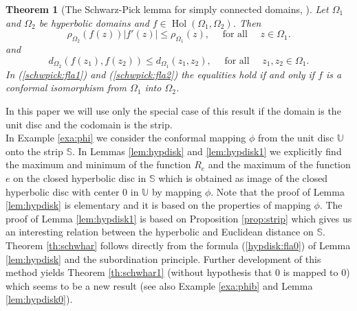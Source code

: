\documentclass{amsart}
\newcommand{\Hol}{\mathop{\mathrm{Hol}}}
\newtheorem{theorem}{Theorem}
\begin{document}
\begin{theorem}[The Schwarz-Pick lemma for simply connected domains, {\cite[Theorem 6.4.]{BeardonMinda}}]\label{th:schwpick}
Let $\Omega_1$ and $\Omega_2$ be hyperbolic domains and $f\in\Hol(\Omega_1,\Omega_2)$. Then
\begin{equation}\label{schwpick:fla1}
    \rho_{\Omega_2}(f(z))|f'(z)|\leqslant\rho_{\Omega_1}(z), \quad \mbox{ for all } \quad z\in\Omega_1.
\end{equation}
and
\begin{equation}\label{schwpick:fla2}
    d_{\Omega_2}(f(z_1),f(z_2))\leqslant d_{\Omega_1}(z_1,z_2), \quad \mbox{ for all } \quad z_1,z_2\in\Omega_1.
\end{equation}
In (\ref{schwpick:fla1}) and (\ref{schwpick:fla2}) the equalities hold if and only if $f$ is a conformal isomorphism from $\Omega_1$ into $\Omega_2$.
\end{theorem}
In this paper we will use only the special case of this result if the domain is the unit disc  and  the  codomain is the strip.\\





In  Example \ref{exa:phi} we consider the conformal mapping $\phi$ from the unit disc $\mathbb{U}$ onto the strip $\mathbb{S}$. In  Lemmas \ref{lem:hypdisk}  and \ref{lem:hypdisk1}  we explicitly find  the maximum and minimum of the function  $R_e$ and the maximum of the function $e$ on the closed hyperbolic disc in $\mathbb{S}$ which is obtained as image of the closed hyperbolic disc with center $0$ in $\mathbb{U}$ by mapping $\phi$. Note that the proof of Lemma \ref{lem:hypdisk} is elementary  and it is based on the properties of mapping $\phi$. The proof of Lemma \ref{lem:hypdisk1} is based on Proposition \ref{prop:strip} which gives us an interesting relation between the hyperbolic and Euclidean distance on $\mathbb{S}$. Theorem \ref{th:schwhar} follows directly  from the formula (\ref{hypdisk:fla0}) of Lemma \ref{lem:hypdisk}  and the subordination principle. Further development  of this  method  yields  Theorem \ref{th:schwhar1} (without hypothesis that $0$ is mapped to $0$) which seems to be a new result (see also Example \ref{exa:phib} and Lemma \ref{lem:hypdisk0}).
\end{document}
